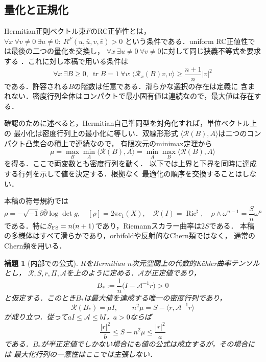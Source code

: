 \documentclass[12pt]{amsart}
\theoremstyle{definition}
\theoremstyle{remark}
\numberwithin{equation}{section}
\DeclareMathOperator{\Ric}{Ric}
\DeclareMathOperator{\tr}{tr}
\theoremstyle{plain}
\newtheorem{jlem}[thm]{補題}
\theoremstyle{remark}
\theoremstyle{definition}
\begin{document}
\subsection{量化と正規化}
Hermitian正則ベクトル束$F$のRC正値性とは，
$\forall x\ \forall v\ne0\ \exists u\ne0:\ R^F(u,\bar u,v,\bar v)>0$
という条件である．uniform RC正値性では最後の二つの量化を交換し，
$\forall x\ \exists u\ne0\ \forall v\ne0$に対して同じ狭義不等式を要求する
\cite[Definition 1.1]{ja:Yang}．これに対し本稿で用いる条件は
\[
 \forall x\ \exists B\geq0,\ \tr B=1\ \forall v:
 \langle\mathscr R_x(B)v,v\rangle\geq\frac{n+1}{n}|v|^2
\]
である．許容される$B$の階数は任意である．滑らかな選択の存在は定義に
含まれない．密度行列全体はコンパクトで最小固有値は連続なので，最大値は存在する．

確認のために述べると，Hermitian自己準同型を対角化すれば，単位ベクトル上の
最小化は密度行列上の最小化に等しい．双線形形式
$\langle\mathscr R(B),A\rangle$は二つのコンパクト凸集合の積上で連続なので，
有限次元のminimax定理から
\[
 \mu=\max_B\min_A\langle\mathscr R(B),A\rangle
     =\min_A\max_B\langle\mathscr R(B),A\rangle
\]
を得る．ここで両変数とも密度行列を動く\cite[Remark 2.1]{ja:DS}．
以下では上界と下界を同時に達成する行列を示して値を決定する．根拠なく
最適化の順序を交換することはしない．

本稿の符号規約では
\[
 \rho=-\sqrt{-1}\partial\bar\partial\log\det g,
 \quad [\rho]=2\pi c_1(X),\quad \mathscr R(I)=\Ric^\sharp,
 \quad \rho\wedge\omega^{n-1}=\frac Sn\omega^n
\]
である．特に$S_{\rm FS}=n(n+1)$であり，Riemannスカラー曲率は$2S$である．
本稿の多様体はすべて滑らかであり，orbifoldや反射的なChern類ではなく，
通常のChern類を用いる．

\begin{jlem}[内部での公式]\label{ja:formula}
$R$をHermitian $n$次元空間上の代数的K\"ahler曲率テンソルとし，
$\mathscr R,S,r,\Pi,\mathcal A$を上のように定める．$\mathcal A$が正定値であり，
\begin{equation}\label{ja:feasible}
 B_*:=\frac1n\bigl(I-\mathcal A^{-1}r\bigr)>0
\end{equation}
と仮定する．このとき$B_*$は最大値を達成する唯一の密度行列であり，
\begin{equation}\label{ja:formulaeq}
 \mathscr R(B_*)=\mu I,\qquad
 n^2\mu=S-\langle r,\mathcal A^{-1}r\rangle
\end{equation}
が成り立つ．従って$aI\leq\mathcal A\leq bI$，$a>0$ならば
\begin{equation}\label{ja:twosided}
 \frac{|r|^2}{b}\leq S-n^2\mu\leq\frac{|r|^2}{a}
\end{equation}
である．$B_*$が半正定値でしかない場合にも値の公式は成立するが，その場合には
最大化行列の一意性はここでは主張しない．
\end{jlem}
\end{document}
